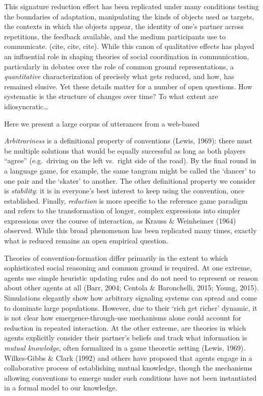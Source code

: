 \documentclass[alpha-refs]{wiley-article}
\begin{document}
This signature reduction effect has been replicated under many conditions testing the boundaries of adaptation, manipulating the kinds of objects used as targets, the contexts in which the objects appear, the identity of one's partner across repetitions, the feedback available, and the medium participants use to communicate. (cite, cite, cite). 
While this canon of qualitative effects has played an influential role in shaping theories of social coordination in communication, particularly in debates over the role of common ground representations, a \emph{quantitative} characterization of precisely what gets reduced, and how, has remained elusive. 
Yet these details matter for a number of open questions. 
How systematic is the structure of changes over time?
To what extent are idiosyncratic\dots
{}

Here we present a large corpus of utterances from a web-based 

\emph{Arbitrariness} is a definitional property of conventions (Lewis,
1969): there must be multiple solutions that would be equally successful
as long as both players ``agree'' (e.g.~driving on the left vs.~right
side of the road). By the final round in a language game, for example,
the same tangram might be called the `dancer' to one pair and the
`skater' to another. The other definitional property we consider is
\emph{stability}: it is in everyone's best interest to keep using the
convention, once established. Finally, \emph{reduction} is more specific
to the reference game paradigm and refers to the transformation of
longer, complex expressions into simpler expressions over the course of
interaction, as Krauss \& Weinheimer (1964) observed. While this broad
phenomenon has been replicated many times, exactly what is reduced
remains an open empirical question.

Theories of convention-formation differ primarily in the extent to which
sophisticated social reasoning and common ground is required. At one
extreme, agents use simple heuristic updating rules and do not need to
represent or reason about other agents at all (Barr, 2004; Centola \&
Baronchelli, 2015; Young, 2015). Simulations elegantly show how
arbitrary signaling systems can spread and come to dominate large
populations. However, due to their `rich get richer' dynamic, it is not
clear how emergence-through-use mechanisms alone could account for
reduction in repeated interaction. At the other extreme, are theories in
which agents explicitly consider their partner's beliefs and track what
information is \emph{mutual knowledge}, often formalized in a game
theoretic setting (Lewis, 1969). Wilkes-Gibbs \& Clark (1992) and others
have proposed that agents engage in a collaborative process of
establishing mutual knowledge, though the mechanisms allowing
conventions to emerge under such conditions have not been instantiated
in a formal model to our knowledge.
\end{document}
